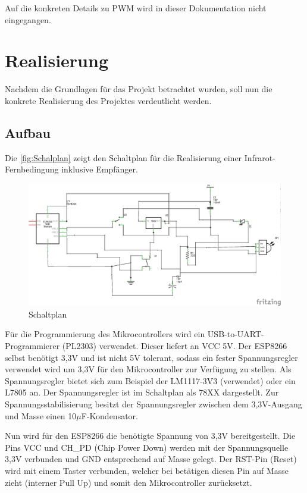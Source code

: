 Auf die konkreten Details zu PWM wird in dieser Dokumentation nicht eingegangen.

\section{Realisierung}
Nachdem die Grundlagen für das Projekt betrachtet wurden, soll nun die konkrete Realisierung des Projektes verdeutlicht werden.

\subsection{Aufbau}
Die \autoref{fig:Schalplan} zeigt den Schaltplan für die Realisierung einer Infrarot-Fernbedingung inklusive Empfänger.

\begin{figure}
	\centering
	\includegraphics[scale=1]{Abbildungen/ESP8266_Schaltplan}
	\caption{Schaltplan}
	\label{fig:Schalplan}
\end{figure}

Für die Programmierung des Mikrocontrollers wird ein USB-to-UART-Programmierer (PL2303) verwendet.
Dieser liefert an VCC 5V.
Der ESP8266 selbst benötigt 3,3V und ist nicht 5V tolerant, sodass ein fester Spannungsregler verwendet wird um 3,3V für den Mikrocontroller zur Verfügung zu stellen.
Als Spannungsregler bietet sich zum Beispiel der LM1117-3V3 (verwendet) oder ein L7805 an.
Der Spannungsregler ist im Schaltplan als 78XX dargestellt.
Zur Spannungsstabilisierung besitzt der Spannungsregler zwischen dem 3,3V-Ausgang und Masse einen 10$\mu$F-Kondensator.

Nun wird für den ESP8266 die benötigte Spannung von 3,3V bereitgestellt.
Die Pins VCC und CH\_PD (Chip Power Down) werden mit der Spannungsquelle 3,3V verbunden und GND entsprechend auf Masse gelegt.
Der RST-Pin (Reset) wird mit einem Taster verbunden, welcher bei betätigen diesen Pin auf Masse zieht (interner Pull Up) und somit den Mikrocontroller zurücksetzt.


